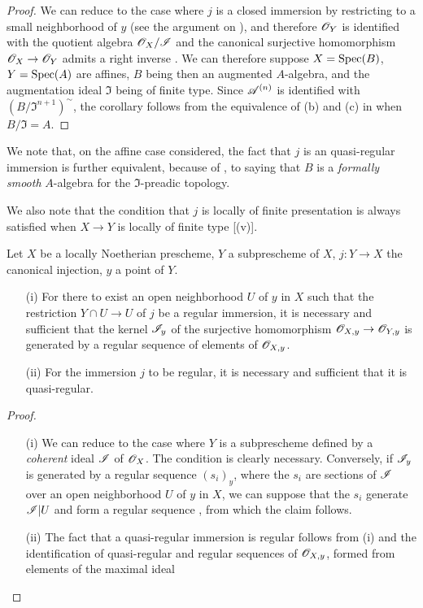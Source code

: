 \begin{proof}
We can reduce to the case where $j$ is a closed immersion by restricting to a small neighborhood of $y$ (see the argument on ), and therefore $\mathscr{O}_Y$ is identified with the quotient algebra $\mathscr{O}_X/\mathscr{I}$ and the canonical surjective homomorphism $\sh{O}_X \to \sh{O}_Y$ admits a
right inverse .
We can therefore suppose $X = \operatorname{Spec}(B)$, $Y = \operatorname{Spec}(A)$ are affines, $B$ being then an augmented $A$-algebra, and the augmentation ideal $\mathfrak{I}$ being of finite type.
Since $\mathscr{A}^{(n)}$ is identified with $(B/\mathfrak{I}^{n+1})^{\sim}$, the  corollary follows from the equivalence of (b) and (c) in  when $B/\mathfrak{I} = A$.
\end{proof}

We note that, on the affine case considered, the fact that $j$ is an quasi-regular immersion is further equivalent, because of , to saying that $B$ is a \emph{formally smooth} $A$-algebra for the $\mathfrak{I}$-preadic topology.

We also note that the condition that $j$ is locally of finite presentation is always satisfied when $X \to Y$ is locally of finite type [(v)].

\begin{proposition}[16.9.10]
\label{IV.16.9.10}
Let $X$ be a locally Noetherian prescheme, $Y$ a subprescheme of $X$, $j:Y \to X$ the canonical injection, $y$ a point of $Y$.
\begin{enumerate}
  \item[\rm{(i)}] For there to exist an open neighborhood $U$ of $y$ in $X$ such that the restriction $Y \cap U \to U$ of $j$ be a regular immersion, it is necessary and sufficient that the kernel $\mathscr{I}_y$ of the surjective homomorphism $\sh{O}_{X,y} \to \sh{O}_{Y,y}$ is generated by a regular sequence of elements of $\mathscr{O}_{X,y}$.

  \item[\rm{(ii)}] For the immersion $j$ to be regular, it is necessary and sufficient that it is quasi-regular.
\end{enumerate}
\end{proposition}

\begin{proof}
  \begin{enumerate}
    \item[\rm{(i)}] We can reduce to the case where $Y$ is a subprescheme defined by a \emph{coherent} ideal $\mathscr{I}$ of $\mathscr{O}_X$.
    The condition is clearly necessary.
    Conversely, if $\mathscr{I}_y$ is generated by a regular sequence $(s_i)_y$, where the $s_i$ are sections of $\mathscr{I}$ over an open neighborhood $U$ of $y$ in $X$, we can suppose that the $s_i$ generate $\mathscr{I}|U$  and form a regular sequence , from which the claim follows.
    \item[\rm{(ii)}] The fact that a quasi-regular immersion is regular follows from (i) and the identification of quasi-regular and regular sequences of $\mathscr{O}_{X,y}$, formed from elements of the maximal ideal 
  \end{enumerate}
\end{proof}

